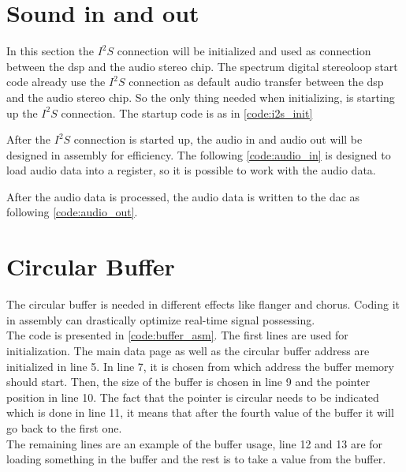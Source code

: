 \section{Sound in and out}
In this section the $I^2S$ connection will be initialized and used as connection between the \gls{dsp} and the audio stereo chip. The spectrum digital stereoloop start code \citep{stereoloop} already use the $I^2S$ connection as default audio transfer between the \gls{dsp} and the audio stereo chip. So the only thing needed when initializing, is starting up the $I^2S$ connection. The startup code is as in \autoref{code:i2s_init}

After the $I^2S$ connection is started up, the audio in and audio out will be designed in assembly for efficiency. The following \autoref{code:audio_in} is designed to load audio data into a register, so it is possible to work with the audio data. 

After the audio data is processed, the audio data is written to the \gls{dac} as following \autoref{code:audio_out}.

\section{Circular Buffer}

The circular buffer is needed in different effects like flanger and chorus. Coding it in assembly can drastically optimize real-time signal possessing. \\

The code is presented in \autoref{code:buffer_asm}. The first lines are used for initialization. The main data page as well as the circular buffer address are initialized in line 5. In line 7, it is chosen from which address the buffer memory should start. Then, the size of the buffer is chosen in line 9 and the pointer position in line 10. The fact that the pointer is circular needs to be indicated which is done in line 11, it means that after the fourth value of the buffer it will go back to the first one.\\

The remaining lines are an example of the buffer usage, line 12 and 13 are for loading something in the buffer and the rest is to take a value from the buffer. 







